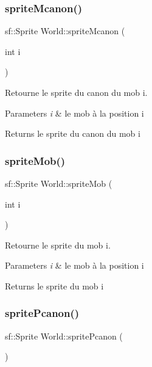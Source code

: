 \subsubsection{\texorpdfstring{sprite\+Mcanon()}{spriteMcanon()}}
{\footnotesize\ttfamily sf\+::\+Sprite World\+::sprite\+Mcanon (\begin{DoxyParamCaption}\item[{int}]{i }\end{DoxyParamCaption})}



Retourne le sprite du canon du mob i. 


\begin{DoxyParams}{Parameters}
{\em i} & le mob à la position i \\
\hline
\end{DoxyParams}
\begin{DoxyReturn}{Returns}
le sprite du canon du mob i 
\end{DoxyReturn}
\mbox{\label{classWorld_a9927043bfd49fe8b6a2222350bf1dee7}} 
\subsubsection{\texorpdfstring{sprite\+Mob()}{spriteMob()}}
{\footnotesize\ttfamily sf\+::\+Sprite World\+::sprite\+Mob (\begin{DoxyParamCaption}\item[{int}]{i }\end{DoxyParamCaption})}



Retourne le sprite du mob i. 


\begin{DoxyParams}{Parameters}
{\em i} & le mob à la position i \\
\hline
\end{DoxyParams}
\begin{DoxyReturn}{Returns}
le sprite du mob i 
\end{DoxyReturn}
\mbox{\label{classWorld_a2b2c53230bf0f789fb38bbd6d5f4feb7}} 
\subsubsection{\texorpdfstring{sprite\+Pcanon()}{spritePcanon()}}
{\footnotesize\ttfamily sf\+::\+Sprite World\+::sprite\+Pcanon (\begin{DoxyParamCaption}{ }\end{DoxyParamCaption})}



